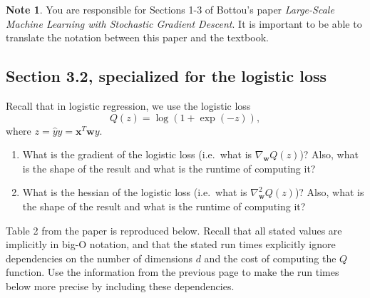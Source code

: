 \documentclass[10pt]{exam}
\theoremstyle{definition}
\newtheorem{problem}{Problem}
\newtheorem{note}{Note}
\newcommand{\trans}[1]{{#1}^{T}}
\newcommand{\w}{\mathbf w}
\newcommand{\x}{\mathbf x}
\begin{document}
\begin{note}
You are responsible for Sections 1-3 of Bottou's paper \emph{Large-Scale Machine Learning with Stochastic Gradient Descent}.
It is important to be able to translate the notation between this paper and the textbook.
\end{note}


\subsection*{Section 3.2, specialized for the logistic loss}

Recall that in logistic regression, we use the logistic loss
\begin{equation}
    Q(z) = \log(1+\exp(-z))
    ,
\end{equation}
where $z = \hat y y = \trans \x \w y$.

\begin{enumerate}
    \item
        What is the gradient of the logistic loss (i.e.\ what is $\nabla_\w Q(z)$)?
        Also, what is the shape of the result and what is the runtime of computing it?
        \vspace{3in}

    \item
        What is the hessian of the logistic loss (i.e.\ what is $\nabla_\w^2 Q(z)$)?
        Also, what is the shape of the result and what is the runtime of computing it?
        \vspace{3in}
\end{enumerate}

\newpage
\noindent
Table 2 from the paper is reproduced below.
Recall that all stated values are implicitly in big-O notation,
and that the stated run times explicitly ignore dependencies on the number of dimensions $d$ and the cost of computing the $Q$ function.
Use the information from the previous page to make the run times below more precise by including these dependencies.
\end{document}
